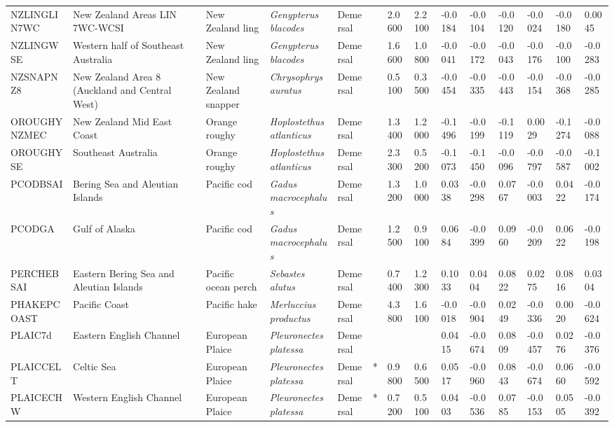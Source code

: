 \begin{longtable}{p{2.8cm}p{2cm}p{1.7cm}p{1.7cm}p{1cm}p{0.3cm}p{1cm}p{1cm}p{1cm}p{1cm}p{1cm}p{1cm}p{1cm}p{1cm}}
  NZLINGLIN7WC & New Zealand Areas LIN 7WC-WCSI & New Zealand ling & \textit{Genypterus blacodes} & Demersal &   & 2.0600 & 2.2100 & -0.0184 & -0.0104 & -0.0120 & -0.0024 & -0.0180 & 0.0045 \\ 
  NZLINGWSE & Western half of Southeast Australia & New Zealand ling & \textit{Genypterus blacodes} & Demersal &   & 1.6600 & 1.0800 & -0.0041 & -0.0172 & -0.0043 & -0.0176 & -0.0100 & -0.0283 \\ 
  NZSNAPNZ8 & New Zealand Area 8 (Auckland and Central West) & New Zealand snapper & \textit{Chrysophrys auratus} & Demersal &   & 0.5100 & 0.3500 & -0.0454 & -0.0335 & -0.0443 & -0.0154 & -0.0368 & -0.0285 \\ 
  OROUGHYNZMEC & New Zealand Mid East Coast & Orange roughy & \textit{Hoplostethus atlanticus} & Demersal &   & 1.3400 & 1.2000 & -0.1496 & -0.0199 & -0.1119 & 0.0029 & -0.1274 & -0.0088 \\ 
  OROUGHYSE & Southeast Australia & Orange roughy & \textit{Hoplostethus atlanticus} & Demersal &   & 2.3300 & 0.5200 & -0.1073 & -0.1450 & -0.0096 & -0.0797 & -0.0587 & -0.1002 \\ 
  PCODBSAI & Bering Sea and Aleutian Islands & Pacific cod & \textit{Gadus macrocephalus} & Demersal &   & 1.3200 & 1.0000 & 0.0338 & -0.0298 & 0.0767 & -0.0003 & 0.0422 & -0.0174 \\ 
  PCODGA & Gulf of Alaska & Pacific cod & \textit{Gadus macrocephalus} & Demersal &   & 1.2500 & 0.9100 & 0.0684 & -0.0399 & 0.0960 & -0.0209 & 0.0622 & -0.0198 \\ 
  PERCHEBSAI & Eastern Bering Sea and Aleutian Islands & Pacific ocean perch & \textit{Sebastes alutus} & Demersal &   & 0.7400 & 1.2300 & 0.1033 & 0.0404 & 0.0822 & 0.0275 & 0.0816 & 0.0304 \\ 
  PHAKEPCOAST & Pacific Coast & Pacific hake & \textit{Merluccius productus} & Demersal &   & 4.3800 & 1.6100 & -0.0018 & -0.0904 & 0.0249 & -0.0336 & 0.0020 & -0.0624 \\ 
  PLAIC7d & Eastern English Channel & European Plaice & \textit{Pleuronectes platessa} & Demersal &  &  &  & 0.0415 & -0.0674 & 0.0809 & -0.0457 & 0.0276 & -0.0376 \\ 
  PLAICCELT & Celtic Sea & European Plaice & \textit{Pleuronectes platessa} & Demersal & * & 0.9800 & 0.6500 & 0.0517 & -0.0960 & 0.0843 & -0.0674 & 0.0660 & -0.0592 \\ 
  PLAICECHW & Western English Channel & European Plaice & \textit{Pleuronectes platessa} & Demersal & * & 0.7200 & 0.5100 & 0.0403 & -0.0536 & 0.0785 & -0.0153 & 0.0505 & -0.0392 \\ 

\end{longtable}
